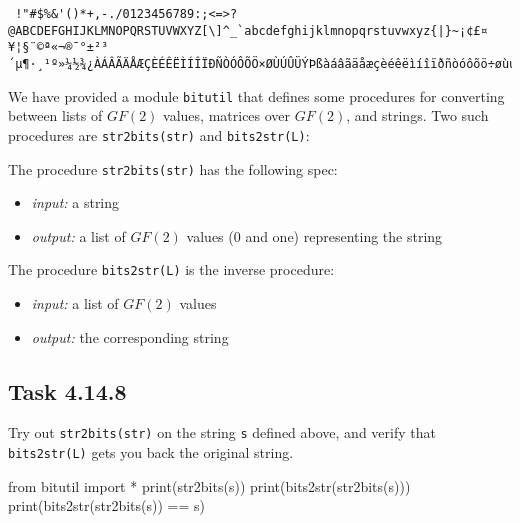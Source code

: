 \documentclass[
  letterpaper,
  DIV=11,
  numbers=noendperiod]{scrartcl}
\newenvironment{Shaded}{\begin{snugshade}}{\end{snugshade}}
\newcommand{\BuiltInTok}[1]{\textcolor[rgb]{0.00,0.23,0.31}{#1}}
\newcommand{\ImportTok}[1]{\textcolor[rgb]{0.00,0.46,0.62}{#1}}
\newcommand{\NormalTok}[1]{\textcolor[rgb]{0.00,0.23,0.31}{#1}}
\newcommand{\OperatorTok}[1]{\textcolor[rgb]{0.37,0.37,0.37}{#1}}
\begin{document}
\begin{lstlisting}
 !"#$%&'()*+,-./0123456789:;<=>?@ABCDEFGHIJKLMNOPQRSTUVWXYZ[\]^_`abcdefghijklmnopqrstuvwxyz{|}~¡¢£¤¥¦§¨©ª«¬®¯°±²³´µ¶·¸¹º»¼½¾¿ÀÁÂÃÄÅÆÇÈÉÊËÌÍÎÏÐÑÒÓÔÕÖ×ØÙÚÛÜÝÞßàáâãäåæçèéêëìíîïðñòóôõö÷øùúûüýþÿ
\end{lstlisting}

We have provided a module \texttt{bitutil} that defines some procedures
for converting between lists of \(GF(2)\) values, matrices over
\(GF(2)\), and strings. Two such procedures are \texttt{str2bits(str)}
and \texttt{bits2str(L)}:

The procedure \texttt{str2bits(str)} has the following spec:

\begin{itemize}
\item \textit{input:} a string
\item \textit{output:} a list of $GF(2)$ values (0 and one) representing the string
\end{itemize}

The procedure \texttt{bits2str(L)} is the inverse procedure:

\begin{itemize}
\item \textit{input:} a list of $GF(2)$ values
\item \textit{output:} the corresponding string
\end{itemize}

\hypertarget{task-4.14.8}{%
\subsection{Task 4.14.8}\label{task-4.14.8}}

Try out \texttt{str2bits(str)} on the string \texttt{s} defined above,
and verify that \texttt{bits2str(L)} gets you back the original string.

\begin{Shaded}
\begin{Highlighting}[numbers=left,,]
\ImportTok{from}\NormalTok{ bitutil }\ImportTok{import} \OperatorTok{*}
\BuiltInTok{print}\NormalTok{(str2bits(s))}
\BuiltInTok{print}\NormalTok{(bits2str(str2bits(s)))}
\BuiltInTok{print}\NormalTok{(bits2str(str2bits(s)) }\OperatorTok{==}\NormalTok{ s)}
\end{Highlighting}
\end{Shaded}
\end{document}
